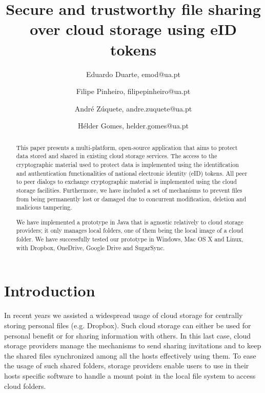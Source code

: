 \documentclass[english]{lni}
\begin{document}
\author[1]{
	Eduardo Duarte,
    emod@ua.pt
}
\author[2]{
	Filipe Pinheiro,
    filipepinheiro@ua.pt
}
\author[3]{
	André Zúquete,
    andre.zuquete@ua.pt
}
\author[4]{
	Hélder Gomes,
    helder.gomes@ua.pt
}



\title{Secure and trustworthy file sharing over cloud storage using eID tokens}


\maketitle
\begin{abstract}
This paper presents a multi-platform, open-source application that aims to
protect data stored and shared in
existing cloud storage services. The access to the cryptographic
material used to protect data is implemented using the
identification and authentication functionalities of
national electronic identity (eID) tokens.
All peer to peer dialogs to exchange cryptographic material is implemented
using the cloud storage facilities. 
Furthermore, we have included a set of mechanisms to prevent files
from being permanently lost or damaged due to concurrent modification,
deletion and malicious tampering.

We have implemented a prototype in Java that is agnostic relatively
to cloud storage providers; it only manages local folders, one of
them being the local image of a cloud folder. We have successfully
tested our prototype in Windows, Mac OS X and Linux, with Dropbox, 
OneDrive, Google Drive and SugarSync.
\end{abstract}

\section{Introduction}

In recent years we assisted a widespread usage of cloud storage for
centrally storing personal files (e.g. Dropbox). Such cloud storage
can either be used for personal benefit or for sharing information
with others. In this last case, cloud storage providers manage the
mechanisms to send sharing invitations and to keep the shared files
synchronized among all the hosts effectively using them. To ease the
usage of such shared folders, storage providers enable users to use
in their hosts specific software to handle a mount point in the
local file system to access cloud folders.
\end{document}

